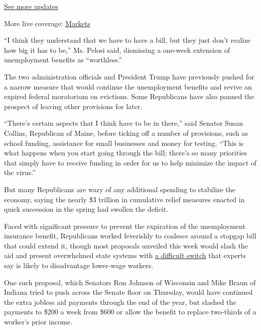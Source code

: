 \href{https://www.nytimes.com/2020/08/01/world/coronavirus-covid-19.html?action=click\&pgtype=Article\&state=default\&region=MAIN_CONTENT_1\&context=storylines_live_updates}{See
more updates}

More live coverage:
\href{https://www.nytimes.com/live/2020/07/31/business/stock-market-today-coronavirus?action=click\&pgtype=Article\&state=default\&region=MAIN_CONTENT_1\&context=storylines_live_updates}{Markets}

``I think they understand that we have to have a bill, but they just
don't realize how big it has to be,'' Ms. Pelosi said, dismissing a
one-week extension of unemployment benefits as ``worthless.''

The two administration officials and President Trump have previously
pushed for a narrow measure that would continue the unemployment
benefits and revive an expired federal moratorium on evictions. Some
Republicans have also panned the prospect of leaving other provisions
for later.

``There's certain aspects that I think have to be in there,'' said
Senator Susan Collins, Republican of Maine, before ticking off a number
of provisions, such as school funding, assistance for small businesses
and money for testing. ``This is what happens when you start going
through the bill; there's so many priorities that simply have to receive
funding in order for us to help minimize the impact of the virus.''

But many Republicans are wary of any additional spending to stabilize
the economy, saying the nearly \$3 trillion in cumulative relief
measures enacted in quick succession in the spring had swollen the
deficit.

Faced with significant pressure to prevent the expiration of the
unemployment insurance benefit, Republicans worked feverishly to
coalesce around a stopgap bill that could extend it, though most
proposals unveiled this week would slash the aid and present overwhelmed
state systems with
\href{https://www.nytimes.com/2020/07/30/business/unemployment-payments-change.html}{a
difficult switch} that experts say is likely to disadvantage lower-wage
workers.

One such proposal, which Senators Ron Johnson of Wisconsin and Mike
Braun of Indiana tried to push across the Senate floor on Thursday,
would have continued the extra jobless aid payments through the end of
the year, but slashed the payments to \$200 a week from \$600 or allow
the benefit to replace two-thirds of a worker's prior income.


